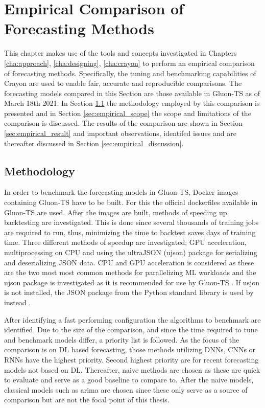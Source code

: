 \chapter{Empirical Comparison of Forecasting Methods\label{cha:chapter6}}

This chapter makes use of the tools and concepts investigated in Chapters \ref{cha:approach}, \ref{cha:designing}, \ref{cha:crayon} to perform an empirical comparison of forecasting methods. Specifically, the tuning and benchmarking capabilities of Crayon are used to enable fair, accurate and reproducible comparisons. The forecasting models compared in this Section are those available in Gluon-TS as of March 18th 2021. In Section \ref{sec:empirical_method} the methodology employed by this comparison is presented and in Section \ref{sec:empirical_scope} the scope and limitations of the comparison is discussed. The results of the comparison are shown in Section \ref{sec:empirical_result} and important observations, identifed issues and  are thereafter discussed in Section \ref{sec:empirical_discussion}.
\section{Methodology}
\label{sec:empirical_method}
In order to benchmark the forecasting models in Gluon-TS, Docker images containing Gluon-TS have to be built. For this the official dockerfiles available in Gluon-TS are used.  After the images are built, methods of speeding up backtesting are investigated. This is done since several thousands of training jobs are required to run, thus, minimizing the time to backtest saves days of training time. Three different methods of speedup are investigated; GPU acceleration, multiprocessing on CPU and using the ultraJSON (ujson) package for serializing and deserializing JSON data. CPU and GPU acceleration is considered as these are the two most most common methods for parallelizing ML workloads and the ujson package is investigated as it is recommended for use by Gluon-TS \cite{gluonts-github}. If usjon is not installed, the JSON package from the Python standard library is used by instead \cite{gluonts-github}.

After identifying a fast performing configuration the algorithms to benchmark are identified. Due to the size of the comparison, and since the time required to tune and benchmark models differ, a priority list is followed. As the focus of the comparison is on DL based forecasting, those methods utilizing DNNs, CNNs or RNNs have the highest priority. Second highest priority are for recent forecasting models not based on DL. Thereafter, naive methods are chosen as these are quick to evaluate and serve as a good baseline to compare to. After the naive models, classical models such as arima are chosen since these only serve as a source of comparison but are not the focal point of this thesis.

